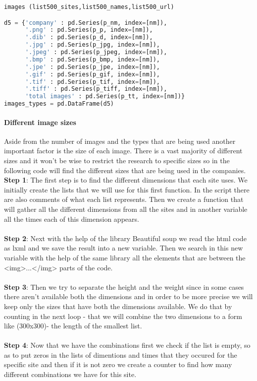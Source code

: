 \documentclass{article}
\begin{document}
\begin{lstlisting}[language=Python]
images (list500_sites,list500_names,list500_url)

d5 = {'company' : pd.Series(p_nm, index=[nm]),
      '.png' : pd.Series(p_p, index=[nm]),
      '.dib' : pd.Series(p_d, index=[nm]),
      '.jpg' : pd.Series(p_jpg, index=[nm]),
      '.jpeg' : pd.Series(p_jpeg, index=[nm]),
      '.bmp' : pd.Series(p_bmp, index=[nm]),
      '.jpe' : pd.Series(p_jpe, index=[nm]),
      '.gif' : pd.Series(p_gif, index=[nm]),
      '.tif' : pd.Series(p_tif, index=[nm]),
      '.tiff' : pd.Series(p_tiff, index=[nm]), 
      'total images' : pd.Series(p_tt, index=[nm])}
images_types = pd.DataFrame(d5)    
\end{lstlisting}
\paragraph{Different image sizes}
Aside from the number of images and the types that are being used another important factor is the size of each image. There is a vast majority of different sizes and it won't be wise to restrict the research to specific sizes so in the following code will find the different sizes that are being used in the companies.\\
\textbf{Step 1}: The first step is to find the different dimensions that each site uses. We initially create the lists that we will use for this first function. In the script there are also comments of what each list represents. Then we create a function that will gather all the different dimensions from all the sites and in another variable all the times each of this dimension appears. \\\\
\textbf{Step 2}: Next with the help of the library Beautiful soup we read the html code as lxml and we save the result into a new variable. Then we search in this new variable with the help of the same library all the elements that are between the <img>...</img> parts of the code.\\\\
\textbf{Step 3}: Then we try to separate the height and the weight since in some cases there aren't available both the dimensions and in order to be more precise we will keep only the sizes that have both the dimensions available. We do that by counting in the next loop - that we will combine the two dimensions to a form like (300x300)- the length of the smallest list. \\\\
\textbf{Step 4}: Now that we have the combinations first we check if the list is empty, so as to put zeros in the lists of dimentions and times that they occured for the specific site and then if it is not zero we create a counter to find how many different combinations we have for this site.\\\\
\end{document}
